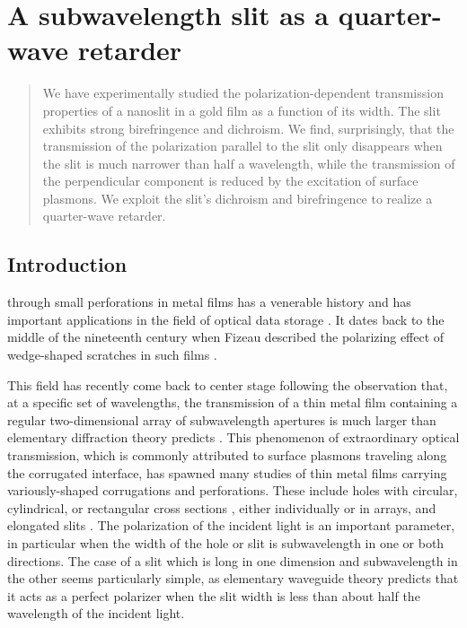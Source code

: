 \chapter{A subwavelength slit as a quarter-wave retarder}
\label{qwp:chapter}


\begin{abstract}
We have experimentally studied the polarization-dependent transmission properties of a nanoslit in a gold film as a function of its width.
The slit exhibits strong birefringence and dichroism.
We find, surprisingly, that the transmission of the polarization parallel to the slit only disappears when the slit is much narrower than half a wavelength, while the transmission of the perpendicular component is reduced by the excitation of surface plasmons.
We exploit the slit's dichroism and birefringence to realize a quarter-wave retarder.
\end{abstract}


\section{Introduction}

 through small perforations in metal films has a venerable history \cite{Rayleigh1897,Bethe1944,Bouwkamp1954,Jones1954} and has important applications in the field of optical data storage \cite{BouwhuisBraat}.
It dates back to the middle of the nineteenth century when Fizeau described the polarizing effect of wedge-shaped scratches in such films \cite{Fizeau1861}.

This field has recently come back to center stage following the observation that, at a specific set of wavelengths, the transmission of a thin metal film containing a regular two-dimensional array of subwavelength apertures is much larger than elementary diffraction theory predicts \cite{Ebbesen1998}.
This phenomenon of extraordinary optical transmission, which is commonly attributed to surface plasmons traveling along the corrugated interface, has spawned many studies of thin metal films carrying variously-shaped corrugations and perforations.
These include holes with circular, cylindrical, or rectangular cross sections \cite{Astilean2000}, either individually or in arrays, and elongated slits \cite{Takakura2001,Yang2002,Suckling2004}.
The polarization of the incident light is an important parameter, in particular when the width of the hole or slit is subwavelength in one or both directions.
The case of a slit which is long in one dimension and subwavelength in the other seems particularly simple, as elementary waveguide theory predicts that it acts as a perfect polarizer when the slit width is less than about half the wavelength of the incident light.

